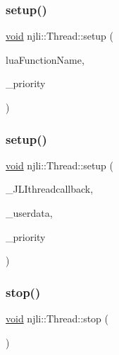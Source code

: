 \subsubsection{\texorpdfstring{setup()}{setup()}\hspace{0.1cm}{\footnotesize\ttfamily [1/2]}}
{\footnotesize\ttfamily \mbox{\hyperlink{_thread_8h_af1e856da2e658414cb2456cb6f7ebc66}{void}} njli\+::\+Thread\+::setup (\begin{DoxyParamCaption}\item[{const std\+::string \&}]{lua\+Function\+Name,  }\item[{int}]{\+\_\+priority }\end{DoxyParamCaption})}

\mbox{\label{classnjli_1_1_thread_ad6f6f4cf48168e85787ad3c0d91f4d3d}} 
\subsubsection{\texorpdfstring{setup()}{setup()}\hspace{0.1cm}{\footnotesize\ttfamily [2/2]}}
{\footnotesize\ttfamily \mbox{\hyperlink{_thread_8h_af1e856da2e658414cb2456cb6f7ebc66}{void}} njli\+::\+Thread\+::setup (\begin{DoxyParamCaption}\item[{J\+L\+Ithreadcallback $\ast$}]{\+\_\+\+J\+L\+Ithreadcallback,  }\item[{\mbox{\hyperlink{_thread_8h_af1e856da2e658414cb2456cb6f7ebc66}{void}} $\ast$}]{\+\_\+userdata,  }\item[{int}]{\+\_\+priority }\end{DoxyParamCaption})\hspace{0.3cm}{\ttfamily [protected]}}

\mbox{\label{classnjli_1_1_thread_a337a98642b6c61d7af26ecc942b7d12c}} 
\subsubsection{\texorpdfstring{stop()}{stop()}}
{\footnotesize\ttfamily \mbox{\hyperlink{_thread_8h_af1e856da2e658414cb2456cb6f7ebc66}{void}} njli\+::\+Thread\+::stop (\begin{DoxyParamCaption}{ }\end{DoxyParamCaption})}

